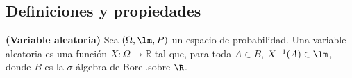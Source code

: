 \subsection{Definiciones y propiedades}
\begin{definition}{\bf (Variable aleatoria)}
   Sea $(\Omega, \lm, P)$ un espacio de probabilidad. Una variable aleatoria es una funci\'on $X\colon \Omega \to \mathbb{R}$ 
   tal que, para toda $A\in B$, $X^{-1}(A)\in \lm$, donde $B$ es la $\sigma$-\'algebra de Borel.sobre $\R$.
\end{definition}

